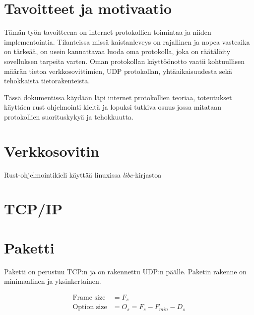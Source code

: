 \documentclass[a4paper,12pt]{article}
\begin{document}
    \section{Tavoitteet ja motivaatio}
    Tämän työn tavoitteena on internet protokollien toimintaa ja niiden implementointia. Tilanteissa missä kaistanleveys on rajallinen ja nopea vasteaika on tärkeää, on usein kannattavaa luoda oma protokolla, joka on räätälöity sovelluksen tarpeita varten.
Oman protokollan käyttöönotto vaatii kohtuullisen määrän tietoa verkkosovittimien, UDP protokollan, yhtäaikaisuudesta sekä tehokkaista tietorakenteista.\par
    Tässä dokumentissa käydään läpi internet protokollien teoriaa, toteutukset käyttäen rust ohjelmointi kieltä ja lopuksi tutkiva osuus jossa mitataan protokollien suorituskykyä ja tehokkuutta.


    \section{Verkkosovitin}\label{sec:verkkosovitin}
    Rust-ohjelmointikieli käyttää linuxissa \textit{libc}-kirjastoa \cite{rust-source-unix-netrs}

    \section{TCP/IP}\label{sec:tcpip}
    \blindtext

    \section{Paketti}\label{sec:paketti}
    Paketti on perustuu TCP:n ja on rakennettu UDP:n päälle. Paketin rakenne on minimaalinen ja yksinkertainen.

\begin{align}
    \text{Frame size} &= F_s \\
    \text{Option size} &= O_s = F_s - F_{min} - D_s
\end{align}
\end{document}
